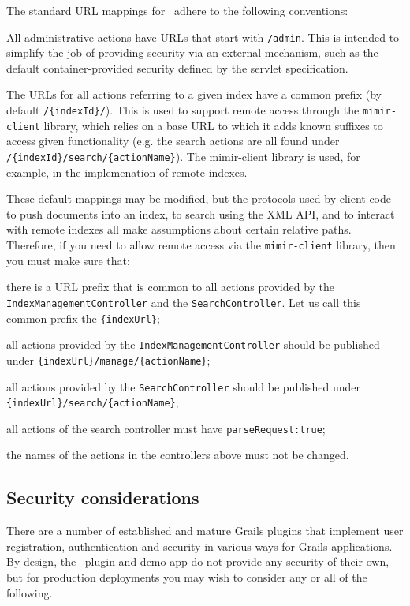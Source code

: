 The standard URL mappings for \Mimir\ adhere to the following conventions:
\bit
  \item All administrative actions have URLs that start with {\tt /admin}. This
  is intended to simplify the job of providing security via an external
  mechanism, such as the default container-provided security defined by the
  servlet specification.
  \item The URLs for all actions referring to a given index have a common prefix
  (by default {\tt /\{indexId\}/}). This is used to support remote access
  through the {\tt mimir-client} library, which relies on a base URL to which it
  adds known suffixes to access given functionality (e.g. the search actions
  are all found under {\tt /\{indexId\}/search/\{actionName\}}). The
  mimir-client library is used, for example, in the implemenation of remote
  indexes.
\eit

These default mappings may be modified, but the protocols used by client
code to push documents into an index, to search using the XML API, and to
interact with remote indexes all make assumptions about certain relative paths.
Therefore, if you need to allow remote access via the {\tt mimir-client}
library, then you must make sure that:

\bit
\item there is a URL prefix that is common to all actions provided by the {\tt
	IndexManagementController} and the {\tt SearchController}. Let us call
	this common prefix the {\tt \{indexUrl\}};
\item all actions provided by the {\tt IndexManagementController} should be
  published under {\tt \{indexUrl\}/manage/\{actionName\}};
\item all actions provided by the {\tt SearchController} should be
  published under {\tt \{indexUrl\}/search/\{actionName\}};
\item all actions of the search controller must have {\tt parseRequest:true}; 
\item the names of the actions in the controllers above must not be changed.
\eit 


\subsection{Security considerations}

There are a number of established and mature Grails plugins that implement user
registration, authentication and security in various ways for Grails
applications.  By design, the \Mimir\ plugin and demo app do not provide any
security of their own, but for production deployments you may wish to consider
any or all of the following.

